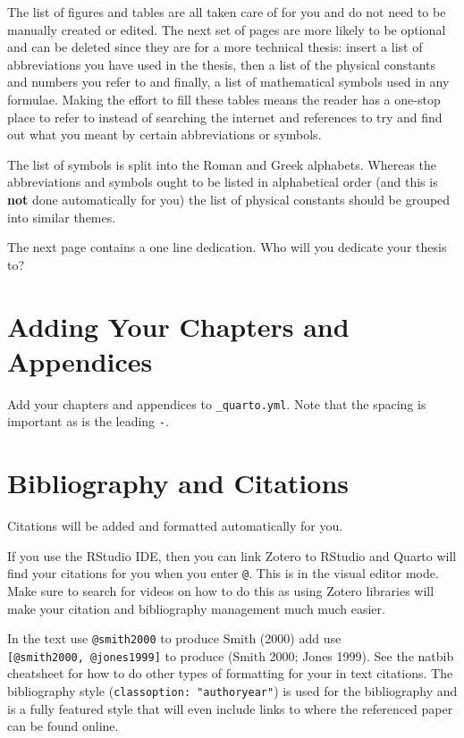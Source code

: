 \documentclass[
  letterpaper,
  11pt,
  english,
  singlespacing,
  headsepline]{MastersDoctoralThesis}
\begin{document}
The list of figures and tables are all taken care of for you and do not
need to be manually created or edited. The next set of pages are more
likely to be optional and can be deleted since they are for a more
technical thesis: insert a list of abbreviations you have used in the
thesis, then a list of the physical constants and numbers you refer to
and finally, a list of mathematical symbols used in any formulae. Making
the effort to fill these tables means the reader has a one-stop place to
refer to instead of searching the internet and references to try and
find out what you meant by certain abbreviations or symbols.

The list of symbols is split into the Roman and Greek alphabets. Whereas
the abbreviations and symbols ought to be listed in alphabetical order
(and this is \textbf{not} done automatically for you) the list of
physical constants should be grouped into similar themes.

The next page contains a one line dedication. Who will you dedicate your
thesis to?

\section{Adding Your Chapters and
Appendices}\label{adding-your-chapters-and-appendices-1}

Add your chapters and appendices to \texttt{\_quarto.yml}. Note that the
spacing is important as is the leading \texttt{-}.

\section{Bibliography and Citations}\label{bibliography-and-citations-1}

Citations will be added and formatted automatically for you.

If you use the RStudio IDE, then you can link Zotero to RStudio and
Quarto will find your citations for you when you enter \texttt{@}. This
is in the visual editor mode. Make sure to search for videos on how to
do this as using Zotero libraries will make your citation and
bibliography management much much easier.

In the text use \texttt{@smith2000} to produce Smith (2000) add use
\texttt{{[}@smith2000,\ @jones1999{]}} to produce (Smith 2000; Jones
1999). See the natbib cheatsheet for how to do other types of formatting
for your in text citations. The bibliography style
(\texttt{classoption:\ "authoryear"}) is used for the bibliography and
is a fully featured style that will even include links to where the
referenced paper can be found online.
\end{document}

